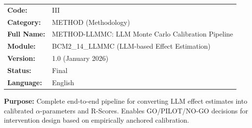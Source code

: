 %
%


\begin{tcolorbox}[colback=gray!5!white, colframe=gray!75!black,
    title=Appendix Header: III METHOD-LLMMC]

\begin{tabular}{@{}ll@{}}
\textbf{Code:} & III \\
\textbf{Category:} & METHOD (Methodology) \\
\textbf{Full Name:} & METHOD-LLMMC: LLM Monte Carlo Calibration Pipeline \\
\textbf{Module:} & BCM2\_14\_LLMMC (LLM-based Effect Estimation) \\
\textbf{Version:} & 1.0 (January 2026) \\
\textbf{Status:} & Final \\
\textbf{Language:} & English \\
\end{tabular}

\vspace{0.5em}
\textbf{Purpose:} Complete end-to-end pipeline for converting LLM effect estimates
into calibrated $\alpha$-parameters and R-Scores. Enables GO/PILOT/NO-GO decisions
for intervention design based on empirically anchored calibration.

\end{tcolorbox}

%
%
%
%

